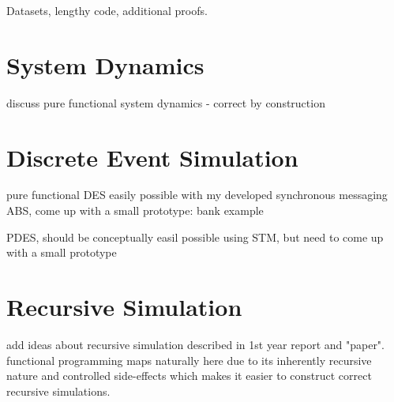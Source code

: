 \begin{appendices}
Datasets, lengthy code, additional proofs.

\chapter{System Dynamics}
discuss pure functional system dynamics - correct by construction

\chapter{Discrete Event Simulation}
pure functional DES easily possible with my developed synchronous messaging ABS, come up with a small prototype: bank example

PDES, should be  conceptually easil possible using STM, but need to come up with a small prototype

\chapter{Recursive Simulation}
add ideas about recursive simulation described in 1st year report and "paper". functional programming maps naturally here due to its inherently recursive nature and controlled side-effects which makes it easier to construct correct recursive simulations.

\end{appendices}